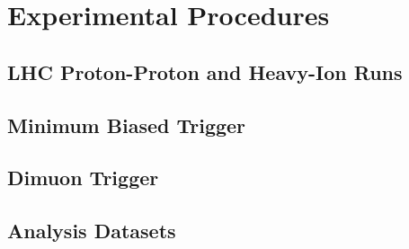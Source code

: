 \chapter{Experimental Procedures}

\section{LHC Proton-Proton and Heavy-Ion Runs}

\section{Minimum Biased Trigger}

\section{Dimuon Trigger}

\section{Analysis Datasets}




